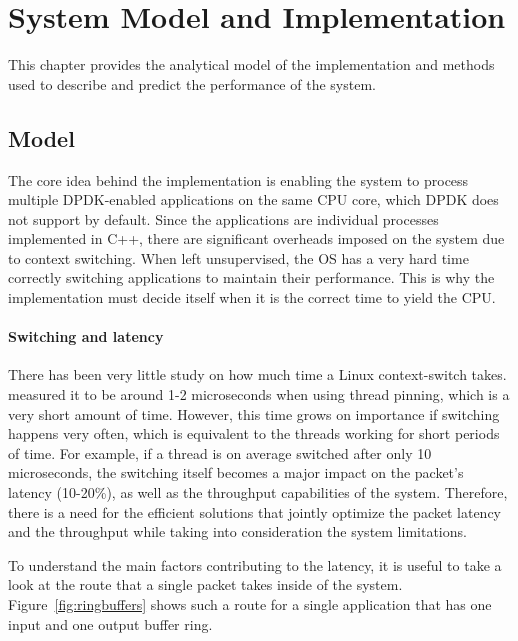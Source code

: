 \documentclass[english]{kththesis}
\begin{document}
\cleardoublepage
\chapter{System Model and Implementation}
\label{ch:whatYouDid}
This chapter provides the analytical model of the implementation and methods used to describe and predict the performance of the system.

\section{Model}
\label{sec:model}
The core idea behind the implementation is enabling the system to process multiple DPDK-enabled applications on the same CPU core, which DPDK does not support by default. Since the applications are individual processes implemented in C++, there are significant overheads imposed on the system due to context switching. When left unsupervised, the OS has a very hard time correctly switching applications to maintain their performance. This is why the implementation must decide itself when it is the correct time to yield the CPU.

\subsubsection{Switching and latency}
There has been very little study on how much time a Linux context-switch takes. \cite{switch_time} measured it to be around 1-2 microseconds when using thread pinning, which is a very short amount of time. However, this time grows on importance if switching happens very often, which is equivalent to the threads working for short periods of time. For example, if a thread is on average switched after only 10 microseconds, the switching itself becomes a major impact on the packet's latency (10-20\%), as well as the throughput capabilities of the system. Therefore, there is a need for the efficient solutions that jointly optimize the packet latency and the throughput while taking into consideration the system limitations.

To understand the main factors contributing to the latency, it is useful to take a look at the route that a single packet takes inside of the system. Figure~\ref{fig:ringbuffers} shows such a route for a single application that has one input and one output buffer ring. 
\end{document}
